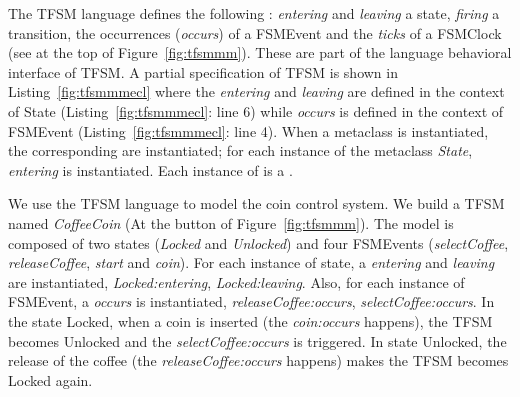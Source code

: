 The TFSM language defines the following \dse: \emph{entering} and \emph{leaving} a state, \emph{firing} a transition, the occurrences (\emph{occurs}) of a FSMEvent and the \emph{ticks} of a FSMClock (see at the top of Figure~\ref{fig:tfsmmm}). These \dse are part of the language behavioral interface of TFSM. %
A partial \ecl specification of TFSM is shown in Listing~\ref{fig:tfsmmmecl} where the \dse \textit{entering} and \textit{leaving} are defined in the context of State (Listing~\ref{fig:tfsmmmecl}: line 6) while \textit{occurs} is defined in the context of FSMEvent (Listing~\ref{fig:tfsmmmecl}: line 4). When a metaclass is instantiated, the corresponding \dse are instantiated; \eg for each instance of the metaclass \emph{State}, \dse \textit{entering} is instantiated. Each instance of \dse is a \mse. 
	
We use the TFSM language to model the coin control system. We build a TFSM named \emph{CoffeeCoin} (At the button of Figure~\ref{fig:tfsmmm}). The model is composed of two states (\emph{Locked} and \emph{Unlocked}) and four FSMEvents (\emph{selectCoffee}, \emph{releaseCoffee}, \emph{start} and \emph{coin}). For each instance of state, a \dse \emph{entering} and \emph{leaving} are instantiated, \eg \emph{Locked:entering}, \emph{Locked:leaving}. Also, for each instance of FSMEvent, a \dse \emph{occurs} is instantiated, \eg \emph{releaseCoffee:occurs}, \emph{selectCoffee:occurs}. In the state Locked, when a coin is inserted (the \mse \emph{coin:occurs} happens), the TFSM becomes Unlocked and the \mse \emph{selectCoffee:occurs} is triggered. In state Unlocked, the release of the coffee (the \mse \emph{releaseCoffee:occurs} happens) makes the TFSM becomes Locked again.   
	
